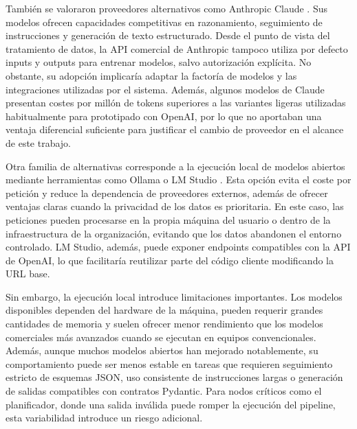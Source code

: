 \documentclass[12pt,a4paper]{article}
\theoremstyle{plain}
\begin{document}
También se valoraron proveedores alternativos como Anthropic Claude \cite{anthropic_api_privacy, anthropic_api_pricing}. Sus modelos ofrecen capacidades competitivas en razonamiento, seguimiento de instrucciones y generación de texto estructurado. Desde el punto de vista del tratamiento de datos, la API comercial de Anthropic tampoco utiliza por defecto inputs y outputs para entrenar modelos, salvo autorización explícita. No obstante, su adopción implicaría adaptar la factoría de modelos y las integraciones utilizadas por el sistema. Además, algunos modelos de Claude presentan costes por millón de tokens superiores a las variantes ligeras utilizadas habitualmente para prototipado con OpenAI, por lo que no aportaban una ventaja diferencial suficiente para justificar el cambio de proveedor en el alcance de este trabajo.

Otra familia de alternativas corresponde a la ejecución local de modelos abiertos mediante herramientas como Ollama o LM Studio \cite{ollama_docs, lmstudio_openai_compat}. Esta opción evita el coste por petición y reduce la dependencia de proveedores externos, además de ofrecer ventajas claras cuando la privacidad de los datos es prioritaria. En este caso, las peticiones pueden procesarse en la propia máquina del usuario o dentro de la infraestructura de la organización, evitando que los datos abandonen el entorno controlado. LM Studio, además, puede exponer endpoints compatibles con la API de OpenAI, lo que facilitaría reutilizar parte del código cliente modificando la URL base.

Sin embargo, la ejecución local introduce limitaciones importantes. Los modelos disponibles dependen del hardware de la máquina, pueden requerir grandes cantidades de memoria y suelen ofrecer menor rendimiento que los modelos comerciales más avanzados cuando se ejecutan en equipos convencionales. Además, aunque muchos modelos abiertos han mejorado notablemente, su comportamiento puede ser menos estable en tareas que requieren seguimiento estricto de esquemas JSON, uso consistente de instrucciones largas o generación de salidas compatibles con contratos Pydantic. Para nodos críticos como el planificador, donde una salida inválida puede romper la ejecución del pipeline, esta variabilidad introduce un riesgo adicional.
\end{document}
